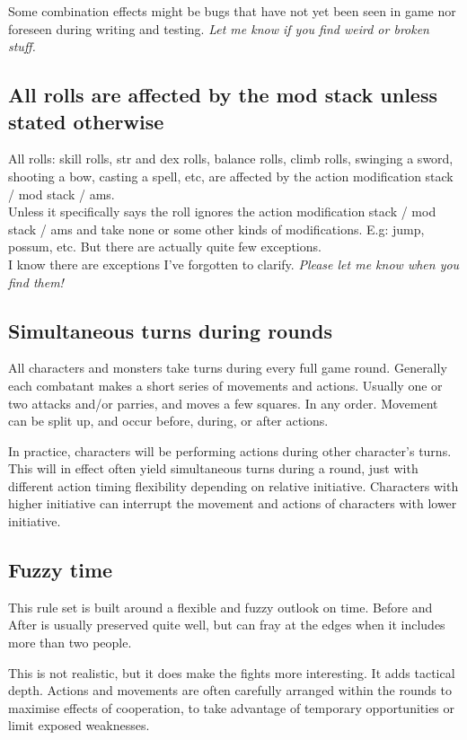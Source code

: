 Some combination effects might be bugs that have not yet been seen in game nor foreseen during writing and testing. \emph{Let me know if you find weird or broken stuff.}


\subsection*{All rolls are affected by the mod stack unless stated otherwise}
All rolls: skill rolls, str and dex rolls, balance rolls, climb rolls, swinging a sword, shooting a bow, casting a spell, etc, are affected by the action modification stack / mod stack / ams.\\
Unless it specifically says the roll ignores the action modification stack / mod stack / ams and take none or some other kinds of modifications. E.g: jump, possum, etc. But there are actually quite few exceptions.\\
\todo I know there are exceptions I've forgotten to clarify. \emph{Please let me know when you find them!}


\subsection*{Simultaneous turns during rounds}
All characters and monsters take turns during every full game round. Generally each combatant makes a short series of movements and actions. Usually one or two attacks and/or parries, and moves a few squares. In any order. Movement can be split up, and occur before, during, or after actions.

In practice, characters will be performing actions during other character's turns. This will in effect often yield simultaneous turns during a round, just with different action timing flexibility depending on relative initiative. Characters with higher initiative can interrupt the movement and actions of characters with lower initiative.


\subsection*{Fuzzy time}
This rule set is built around a flexible and fuzzy outlook on time. Before and After is usually preserved quite well, but can fray at the edges when it includes more than two people.

This is not realistic, but it does make the fights more interesting. It adds tactical depth. Actions and movements are often carefully arranged within the rounds to maximise effects of cooperation, to take advantage of temporary opportunities or limit exposed weaknesses.


